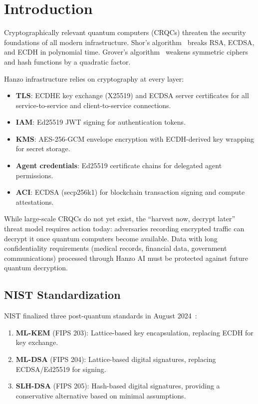 \section{Introduction}

\label{sec:intro}

Cryptographically relevant quantum computers (CRQCs) threaten the security
foundations of all modern infrastructure. Shor's algorithm~\cite{shor1994}
breaks RSA, ECDSA, and ECDH in polynomial time. Grover's
algorithm~\cite{grover1996} weakens symmetric ciphers and hash functions by a
quadratic factor.

Hanzo infrastructure relies on cryptography at every layer:
\begin{itemize}[leftmargin=1.1em]
    \item \textbf{TLS}: ECDHE key exchange (X25519) and ECDSA server
    certificates for all service-to-service and client-to-service connections.
    \item \textbf{IAM}: Ed25519 JWT signing for authentication tokens.
    \item \textbf{KMS}: AES-256-GCM envelope encryption with ECDH-derived
    key wrapping for secret storage.
    \item \textbf{Agent credentials}: Ed25519 certificate chains for delegated
    agent permissions.
    \item \textbf{ACI}: ECDSA (secp256k1) for blockchain transaction signing
    and compute attestations.
\end{itemize}

While large-scale CRQCs do not yet exist, the ``harvest now, decrypt later''
threat model requires action today: adversaries recording encrypted traffic can
decrypt it once quantum computers become available. Data with long
confidentiality requirements (medical records, financial data, government
communications) processed through Hanzo AI must be protected against future
quantum decryption.

\subsection{NIST Standardization}

NIST finalized three post-quantum standards in August 2024~\cite{nistpq}:
\begin{enumerate}[leftmargin=1.4em]
    \item \textbf{ML-KEM} (FIPS 203): Lattice-based key encapsulation,
    replacing ECDH for key exchange.
    \item \textbf{ML-DSA} (FIPS 204): Lattice-based digital signatures,
    replacing ECDSA/Ed25519 for signing.
    \item \textbf{SLH-DSA} (FIPS 205): Hash-based digital signatures,
    providing a conservative alternative based on minimal assumptions.
\end{enumerate}

